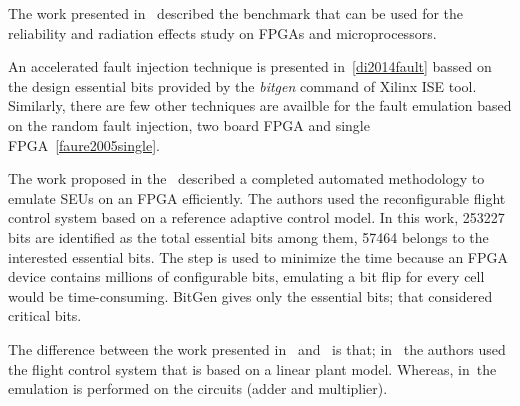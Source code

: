The work presented in~\cite{quinn2015using} described the benchmark that can be used for the reliability and radiation effects study on FPGAs and microprocessors. 

An accelerated fault injection technique is presented in~\ref{di2014fault} bassed on the design essential bits provided by the \textit{bitgen} command of Xilinx ISE tool. Similarly, there are few other techniques are availble for the fault emulation based on the random fault injection, two board FPGA and single FPGA~\ref{faure2005single}.


The work  proposed in the~\cite{hobeika2013flight} described a completed automated methodology to emulate SEUs on an FPGA efficiently. The authors used the reconfigurable flight control system based on a reference adaptive control model. 
In this work, 253227 bits are identified as the total essential bits among them, 57464 belongs to the interested essential bits. The step is used to minimize the time because an FPGA device contains millions of configurable bits, emulating a bit flip for every cell would be time-consuming. BitGen gives only the essential bits; that
considered critical bits.  

The difference between the work presented in~\cite{hobeika2014multi} and~\cite{hobeika2013flight} is that; in~\cite{hobeika2013flight} the authors used the flight control system that is based on a linear plant model. Whereas, in~\cite{hobeika2014multi}the emulation is performed on the circuits (adder and multiplier). 



%
%        
%        
%



